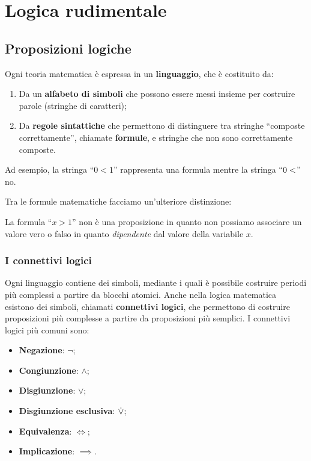 \chapter{Logica rudimentale}

\section{Proposizioni logiche}
Ogni teoria matematica è espressa in un \textbf{linguaggio}, che è costituito da:
\begin{enumerate}
	\item Da un \textbf{alfabeto di simboli} che possono essere messi insieme per costruire parole (stringhe di caratteri);
	\item Da \textbf{regole sintattiche} che permettono di distinguere tra stringhe ``composte correttamente'', chiamate \textbf{formule}, e stringhe che non sono correttamente composte.
\end{enumerate}

\begin{example}
	Ad esempio, la stringa ``$0<1$'' rappresenta una formula mentre la stringa $``0<$'' no.
\end{example}
Tra le formule matematiche facciamo un'ulteriore distinzione: 


\begin{example}
	La formula ``$x>1$'' non è una proposizione in quanto non possiamo associare un valore vero o falso in quanto \textit{dipendente} dal valore della variabile $x$.
\end{example}
\subsection{I connettivi logici}
Ogni linguaggio contiene dei simboli, mediante i quali è possibile costruire periodi più complessi a partire da blocchi atomici. Anche nella logica matematica esistono dei simboli, chiamati \textbf{connettivi logici}, che permettono di costruire proposizioni più complesse a partire da proposizioni più semplici. I connettivi logici più comuni sono:
\begin{itemize}
	\item \textbf{Negazione}: $\neg$;
	\item \textbf{Congiunzione}: $\land$;
	\item \textbf{Disgiunzione}: $\lor$;
	\item \textbf{Disgiunzione esclusiva}: ${\displaystyle{\dot{\vee}}}$;
	\item \textbf{Equivalenza}: $\iff$;
	\item \textbf{Implicazione}: $\implies$.
\end{itemize}
